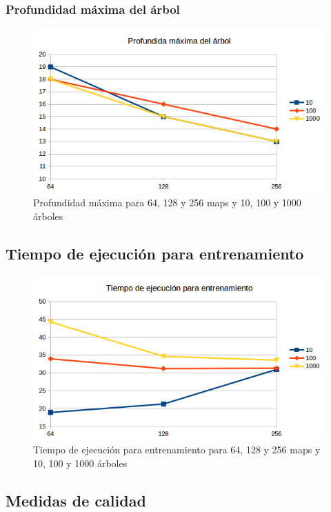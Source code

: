 \subsubsection{Profundidad máxima del árbol}

\begin{figure}[H]
	\centering
	\includegraphics[width=12cm]{img/profundidad-maxima}
	\caption{Profundidad máxima para 64, 128 y 256 maps y 10, 100 y 1000 árboles}
	\label{fig:profundidad-maxima}
\end{figure}

\subsection{Tiempo de ejecución para entrenamiento}

\begin{figure}[H]
	\centering
	\includegraphics[width=12cm]{img/tiempo-entrenamiento}
	\caption{Tiempo de ejecución para entrenamiento para 64, 128 y 256 maps y 10, 100 y 1000 árboles}
	\label{fig:tiempo-entrenamiento}
\end{figure}

\subsection{Medidas de calidad}

